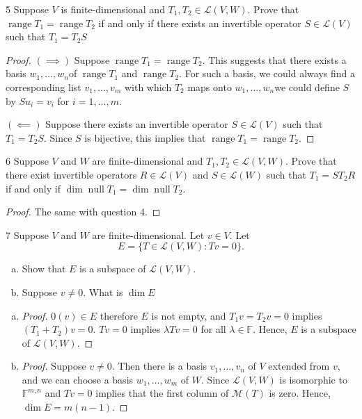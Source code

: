 \documentclass{article}
\newenvironment{problem}[1]{\begin{prob*}{#1}{}}{\end{prob*}}
\newcommand{\F}{\mathbb{F}}
\DeclareMathOperator{\Null}{null}
\DeclareMathOperator{\Range}{range}
\begin{document}
\newpage

\begin{problem}{5}
Suppose $V$ is finite-dimensional and $T_1, T_2 \in \mathcal{L}(V,W)$. Prove that $\Range T_1 = \Range T_2$ if and only if there exists an invertible operator $S \in \mathcal{L}(V)$ such that $T_1 = T_2S$
\end{problem}
\begin{proof}
	$(\implies)$ Suppose $\Range T_1 = \Range T_2$. This suggests that there exists a basis $w_1, \ldots ,w_n$of $\Range T_1$ and $\Range T_2$. For such a basis, we could always find a corresponding list $v_1, \ldots ,v_m$ with which $T_2$ maps onto $w_1, \ldots ,w_n$we could define $S$ by $Su_i = v_i$ for $i = 1, \ldots, m$.

	$(\impliedby)$ Suppose there exists an invertible operator $S \in \mathcal{L}(V)$ such that $T_1 = T_2S$. Since $S$ is bijective, this implies that $\Range T_1 = \Range T_2$.
\end{proof}

\begin{problem}{6}
Suppose $V$ and $W$ are finite-dimensional and $T_1, T_2 \in \mathcal{L}(V,W)$. Prove that there exist invertible operators $R \in \mathcal{L}(V)$ and $S \in \mathcal{L}(W)$ such that $T_1 = ST_2R $ if and only if $\operatorname{dim}\Null T_1 = \operatorname{dim}\Null T_2$.
\end{problem}
\begin{proof}
	The same with question 4.
\end{proof}

\begin{problem}{7}
Suppose $V$ and $W$ are finite-dimensional. Let $v \in V$. Let \[
	E = \{T \in \mathcal{L}(V,W) : Tv = 0\}.\]
\begin{enumerate}[(a)]
	\item Show that $E$ is a subspace of $\mathcal{L}(V,W)$.
	\item Suppose $v \neq 0.$ What is $\operatorname{dim} E$
\end{enumerate}
\end{problem}
\begin{enumerate}[(a)]
	\item \begin{proof}
		      $0(v) \in E$ therefore $E$ is not empty, and $T_1v = T_2v = 0$ implies $(T_1 + T_2)v = 0$. $Tv = 0$ implies $\lambda Tv = 0$ for all $\lambda \in \F$. Hence, $E$ is a subspace of $\mathcal{L}(V,W)$.
	      \end{proof}
	\item \begin{proof}
		      Suppose $v \neq 0$. Then there is a basis $v_1, \ldots ,v_n$ of $V$ extended from $v$, and we can choose a basis $w_1, \ldots, w_m$ of $W$. Since $\mathcal{L}(V,W)$ is isomorphic to $\mathbb{F}^{m,n}$ and $Tv = 0$ implies that the first column of $\mathcal{M}(T)$ is zero. Hence, $\operatorname{dim} E = m(n-1)$.
	      \end{proof}
\end{enumerate}
\end{document}
